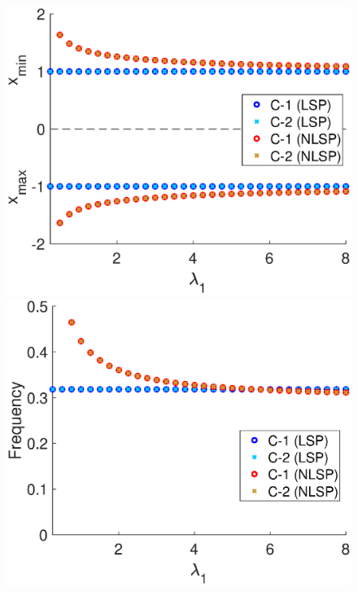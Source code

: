 \begin{figure}[h]
\centering
  \begin{minipage}{0.45\linewidth}
  \centering
    \includegraphics[width=1\linewidth]{Images/photo18_1.eps} 
  \end{minipage} 
  \begin{minipage}{0.45\linewidth}
  \centering
    \includegraphics[width=1\linewidth]{Images/photo18_2.eps} 
  \end{minipage} 
  

\end{figure}
